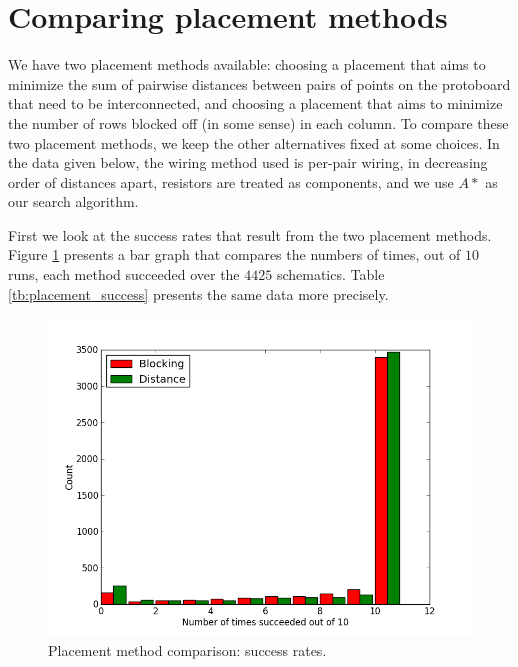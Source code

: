 \section{Comparing placement methods}

We have two placement methods available: choosing a placement that aims to
minimize the sum of pairwise distances between pairs of points on the protoboard
that need to be interconnected, and choosing a placement that aims to minimize
the number of rows blocked off (in some sense) in each column. To compare these
two placement methods, we keep the other alternatives fixed at some choices.
In the data given below, the wiring method used is per-pair wiring, in decreasing
order of distances apart, resistors are treated as components, and we use $A*$ as
our search algorithm.

First we look at the success rates that result from the two placement methods.
Figure \ref{fig:placement_success} presents a bar graph that compares the numbers
of times, out of $10$ runs, each method succeeded over the $4425$ schematics.
Table \ref{tb:placement_success} presents the same data more precisely.

\begin{figure}[H]
\begin{center}
\includegraphics[width=\textwidth]{Images/placement_success_comparison.png}
\caption{Placement method comparison: success rates.}
\label{fig:placement_success}
\end{center}
\end{figure}

